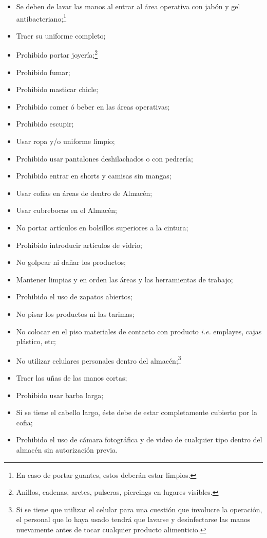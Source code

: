 \begin{itemize}
	\item Se deben de lavar las manos al entrar al área operativa con jabón y gel antibacteriano;\footnote{En caso de portar guantes, estos deberán estar limpios.}
	\item Traer su uniforme completo;
	\item Prohibido portar joyería;\footnote{Anillos, cadenas, aretes, pulseras, piercings en lugares visibles.}
	\item Prohibido fumar;
	\item Prohibido masticar chicle;
	\item Prohibido comer ó beber en las áreas operativas;
	\item Prohibido escupir;
	\item Usar ropa y/o uniforme limpio;
	\item Prohibido usar pantalones deshilachados o con pedrería;
	\item Prohibido entrar en shorts y camisas sin mangas;
	\item Usar cofias en áreas de dentro de Almacén;
	\item Usar cubrebocas en el Almacén;
	\item No portar artículos en bolsillos superiores a la cintura;
	\item Prohibido introducir artículos de vidrio;
	\item No golpear ni dañar los productos;
	\item Mantener limpias y en orden las áreas y las herramientas de trabajo;
	\item Prohibido el uso de zapatos abiertos;
	\item No pisar los productos ni las tarimas;
	\item No colocar en el piso materiales de contacto con producto \emph{i.e.} emplayes, cajas plástico, etc;
	\item No utilizar celulares personales dentro del almacén;\footnote{Si se tiene que utilizar el celular para una cuestión que involucre la operación, el personal que lo haya usado tendrá que lavarse y desinfectarse las manos nuevamente antes de tocar cualquier producto alimenticio.}
	\item Traer las uñas de las manos cortas;
	\item Prohibido usar barba larga;
	\item Si se tiene el cabello largo, éste debe de estar completamente cubierto por la cofia;
	\item Prohibido el uso de cámara fotográfica y de video de cualquier tipo dentro del almacén sin autorización previa.
\end{itemize}

